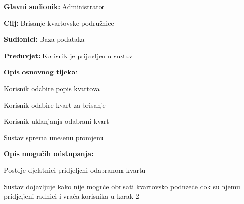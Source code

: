 				
				
				\noindent {}
					\begin{packed_item}
	
						\item \textbf{Glavni sudionik: }Administrator
						\item  \textbf{Cilj:} Brisanje kvartovske podružnice
						\item  \textbf{Sudionici:} Baza podataka
						\item  \textbf{Preduvjet:} Korisnik je prijavljen u sustav
						\item  \textbf{Opis osnovnog tijeka:}
						
						\item[] \begin{packed_enum}
	
							\item Korisnik odabire popis kvartova
							\item Korisnik odabire kvart za brisanje 
							\item Korisnik uklanjanja odabrani kvart
							\item Sustav sprema unesenu promjenu						
							
							\end{packed_enum}
						
						\item  \textbf{Opis mogućih odstupanja:}
						
						\item[] \begin{packed_item}
	
							\item[3.a] Postoje djelatnici pridjeljeni odabranom kvartu 
							
							\item[] \begin{packed_enum}
								
								\item Sustav dojavljuje kako nije moguće obrisati kvartovsko poduzeće dok su njemu pridjeljeni radnici i vraća korisnika u korak 2
								
							\end{packed_enum}
						\end{packed_item}
					\end{packed_item}
				
